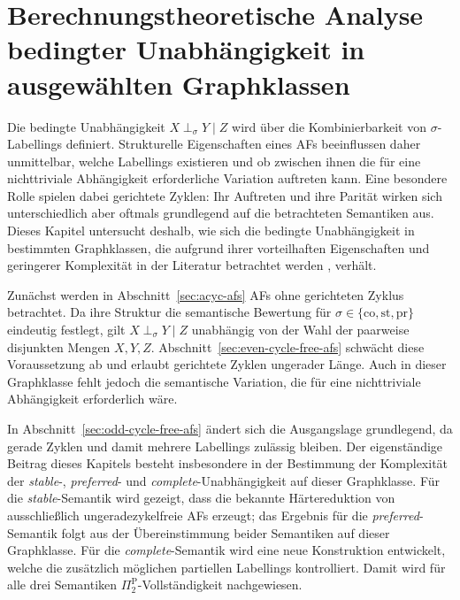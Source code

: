 \chapter{Berechnungstheoretische Analyse bedingter Unabhängigkeit in ausgewählten Graphklassen}
\label{ch:graphclasses}

Die bedingte Unabhängigkeit \(X\perp_\sigma Y\mid Z\) wird über die Kombinierbarkeit 
von \(\sigma\)-Labellings definiert. Strukturelle Eigenschaften eines AFs 
beeinflussen daher unmittelbar, welche Labellings existieren und ob zwischen 
ihnen die für eine nichttriviale Abhängigkeit erforderliche Variation auftreten kann. 
Eine besondere Rolle spielen dabei gerichtete Zyklen: Ihr Auftreten und ihre Parität 
wirken sich unterschiedlich aber oftmals grundlegend auf die betrachteten Semantiken aus. 
Dieses Kapitel untersucht deshalb, wie sich die bedingte Unabhängigkeit in bestimmten 
Graphklassen, die aufgrund ihrer vorteilhaften Eigenschaften und geringerer Komplexität 
in der Literatur betrachtet werden \cite{dung:1995:af,DUNNE2002187,handbook__of_formal_argumentation__vol__3:2024}, verhält.

Zunächst werden in Abschnitt~\ref{sec:acyc-afs} AFs ohne gerichteten Zyklus betrachtet. 
Da ihre Struktur die semantische Bewertung für
\(\sigma\in\{\mathrm{co},\mathrm{st},\mathrm{pr}\}\) 
eindeutig festlegt, gilt \(X\perp_\sigma Y\mid Z\) unabhängig von der Wahl 
der paarweise disjunkten Mengen \(X,Y,Z\). Abschnitt~\ref{sec:even-cycle-free-afs} 
schwächt diese Voraussetzung ab und erlaubt gerichtete Zyklen ungerader Länge. 
Auch in dieser Graphklasse fehlt jedoch die semantische Variation, 
die für eine nichttriviale Abhängigkeit erforderlich wäre.

In Abschnitt~\ref{sec:odd-cycle-free-afs} ändert sich die Ausgangslage grundlegend, 
da gerade Zyklen und damit mehrere Labellings zulässig bleiben. 
Der eigenständige Beitrag dieses Kapitels besteht insbesondere in der Bestimmung der 
Komplexität der \emph{stable}-, \emph{preferred}- und \emph{complete}-Unabhängigkeit 
auf dieser Graphklasse. Für die \emph{stable}-Semantik wird gezeigt, dass die bekannte 
Härtereduktion von \textcite{bluemel:2025:independence-aba} ausschließlich 
ungeradezykelfreie AFs erzeugt; das Ergebnis für die \emph{preferred}-Semantik folgt 
aus der Übereinstimmung beider Semantiken auf dieser Graphklasse. Für die \emph{complete}-Semantik 
wird eine neue Konstruktion entwickelt, welche die zusätzlich möglichen 
partiellen Labellings kontrolliert. 
Damit wird für alle drei Semantiken \(\Pi_2^{\mathrm{P}}\)-Vollständigkeit nachgewiesen.

